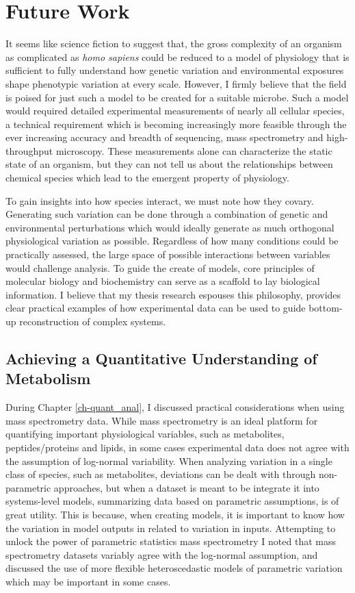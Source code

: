 \section{Future Work}

It seems like science fiction to suggest that, the gross complexity of an organism as complicated as \textit{homo sapiens} could be reduced to a model of physiology that is sufficient to fully understand how genetic variation and environmental exposures shape phenotypic variation at every scale. However, I firmly believe that the field is poised for just such a model to be created for a suitable microbe. Such a model would required detailed experimental measurements of nearly all cellular species, a technical requirement which is becoming increasingly more feasible through the ever increasing accuracy and breadth of sequencing, mass spectrometry and high-throughput microscopy. These measurements alone can characterize the static state of an organism, but they can not tell us about the relationships between chemical species which lead to the emergent property of physiology. 

To gain insights into how species interact, we must note how they covary. Generating such variation can be done through a combination of genetic and environmental perturbations which would ideally generate as much orthogonal physiological variation as possible. Regardless of how many conditions could be practically assessed, the large space of possible interactions between variables would challenge analysis. To guide the create of models, core principles of molecular biology and biochemistry can serve as a scaffold to lay biological information. I believe that my thesis research espouses this philosophy, provides clear practical examples of how experimental data can be used to guide bottom-up reconstruction of complex systems.

\subsection{Achieving a Quantitative Understanding of Metabolism}

During Chapter \ref{ch-quant_anal}, I discussed practical considerations when using mass spectrometry data.  While mass spectrometry is an ideal platform for quantifying important physiological variables, such as metabolites, peptides/proteins and lipids, in some cases experimental data does not agree with the assumption of log-normal variability. When analyzing variation in a single class of species, such as metabolites, deviations can be dealt with through non-parametric approaches, but when a dataset is meant to be integrate it into systems-level models, summarizing data based on parametric assumptions, is of great utility.  This is because, when creating models, it is important to know how the variation in model outputs in related to variation in inputs. Attempting to unlock the power of parametric statistics mass spectrometry I noted that mass spectrometry datasets variably agree with the log-normal assumption, and discussed the use of more flexible heteroscedastic models of parametric variation which may be important in some cases.

